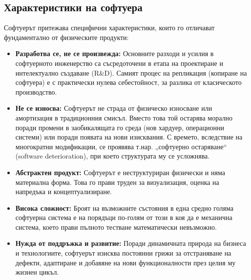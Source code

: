 \documentclass{scrartcl}
\begin{document}
\begin{FlushLeft}
\subsection{Характеристики на софтуера}
Софтуерът притежава специфични характеристики, които го отличават фундаментално от физическите продукти:
\begin{itemize}
    \item \textbf{Разработва се, не се произвежда:} Основните разходи и усилия в софтуерното инженерство са съсредоточени в етапа на проектиране и интелектуално създаване (R\&D). Самият процес на репликация (копиране на софтуера) е с практически нулева себестойност, за разлика от класическото производство.
    \item \textbf{Не се износва:} Софтуерът не страда от физическо износване или амортизация в традиционния смисъл. Вместо това той остарява морално поради промени в заобикалящата го среда (нов хардуер, операционни системи) или поради появата на нови изисквания. С времето, вследствие на многократни модификации, се проявява т.нар. „софтуерно остаряване“ (software deterioration), при което структурата му се усложнява.
    \item \textbf{Абстрактен продукт:} Софтуерът е неструктуриран физически и няма материална форма. Това го прави труден за визуализация, оценка на напредъка и концептуализиране.
    \item \textbf{Висока сложност:} Броят на възможните състояния в една средно голяма софтуерна система е на порядъци по-голям от този в коя да е механична система, което прави пълното тестване математически невъзможно.
    \item \textbf{Нужда от поддръжка и развитие:} Поради динамичната природа на бизнеса и технологиите, софтуерът изисква постоянни грижи за отстраняване на дефекти, адаптиране и добавяне на нови функционалности през целия му жизнен цикъл.
\end{itemize}


\end{FlushLeft}
\end{document}
